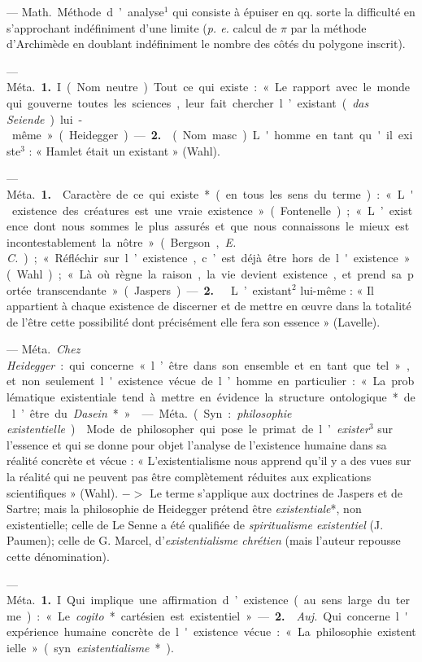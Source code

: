\begin{itemize}[leftmargin=1cm, label=, itemsep=1pt]
 — \si{Math.} Méthode d’analyse$^1$
qui consiste à épuiser en qq.
sorte la difficulté en s’approchant
indéfiniment d’une limite ({\it p. e.} calcul
de $\pi$ par la méthode d’Archimède
en doublant indéfiniment le nombre
des côtés du polygone inscrit).

 — \si{Méta.} {\bf 1.} I (Nom neutre).
Tout ce qui existe : « Le rapport avec le monde qui gouverne
toutes les sciences, leur fait chercher l’existant
({\it das Seiende}) lui-même » (Heidegger). — {\bf 2.} 
(Nom masc.) L'homme en tant qu'il existe$^3$ : « Hamlet était
un existant » (Wahl).

 — \si{Méta.} {\bf 1.}  Caractère de
ce qui existe* (en tous les sens du
terme) : « L'existence des créatures
est une vraie existence. » (Fontenelle); « L’existence dont nous
sommes le plus assurés et que nous
connaissons le mieux est incontestablement la nôtre » (Bergson, {\it E. C.});
« Réfléchir sur l’existence, c’est déjà
être hors de l'existence » (Wahl);
« Là où règne la raison, la vie devient
existence, et prend sa portée transcendante » (Jaspers).
— {\bf 2.}  
L’existant$^2$ lui-même : « Il appartient
à chaque existence de discerner et de
mettre en œuvre dans la totalité de
l'être cette possibilité dont précisément elle fera son essence » (Lavelle).

 — \si{Méta.} {\it Chez Heidegger} :
qui concerne « l’être dans son ensemble et en tant que tel », et non
seulement l'existence vécue de
l’homme en particulier : « La problématique existentiale tend à mettre
en évidence la structure ontologique* de l’être du {\it Dasein}* ».

 — \si{Méta.} (Syn. : {\it philosophie existentielle}).
 Mode de philosopher qui pose le primat de
l’{\it exister}$^3$ sur l'essence et qui se
donne pour objet l’analyse de l’existence humaine dans sa réalité
concrète et vécue : « L’existentialisme
nous apprend qu'il y a des vues sur
la réalité qui ne peuvent pas être
complètement réduites aux explications scientifiques » (Wahl). $->$
Le terme s'applique aux doctrines
de Jaspers et de Sartre; mais la
philosophie de Heidegger prétend
être {\it existentiale}*, non existentielle;
celle de Le Senne a été qualifiée de
{\it spiritualisme existentiel} (J. Paumen);
celle de G. Marcel, d’{\it existentialisme
chrétien} (mais l’auteur repousse
cette dénomination).

 — \si{Méta.} {\bf 1.} I Qui implique
une affirmation d’existence (au sens
large du terme) : « Le {\it cogito}* cartésien est existentiel ».
— {\bf 2.}  {\it Auj.}
Qui concerne l'expérience humaine
concrète de l'existence vécue : « La
philosophie existentielle » (syn.
{\it existentialisme}*).


\end{itemize}
